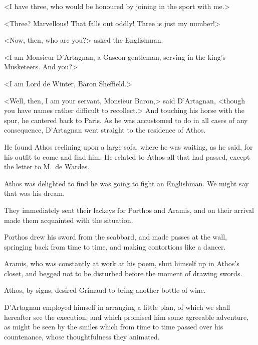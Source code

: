 <I have three, who would be honoured by joining in the sport with me.> 

<Three? Marvellous! That falls out oddly! Three is just my number!> 

<Now, then, who are you?> asked the Englishman. 

<I am Monsieur D'Artagnan, a Gascon gentleman, serving in the king's Musketeers. And you?> 

<I am Lord de Winter, Baron Sheffield.> 

<Well, then, I am your servant, Monsieur Baron,> said D'Artagnan, <though you have names rather difficult to recollect.> And touching his horse with the spur, he cantered back to Paris. As he was accustomed to do in all cases of any consequence, D'Artagnan went straight to the residence of Athos. 

He found Athos reclining upon a large sofa, where he was waiting, as he said, for his outfit to come and find him. He related to Athos all that had passed, except the letter to M.~de Wardes. 

Athos was delighted to find he was going to fight an Englishman. We might say that was his dream. 

They immediately sent their lackeys for Porthos and Aramis, and on their arrival made them acquainted with the situation. 

Porthos drew his sword from the scabbard, and made passes at the wall, springing back from time to time, and making contortions like a dancer. 

Aramis, who was constantly at work at his poem, shut himself up in Athos's closet, and begged not to be disturbed before the moment of drawing swords. 

Athos, by signs, desired Grimaud to bring another bottle of wine. 

D'Artagnan employed himself in arranging a little plan, of which we shall hereafter see the execution, and which promised him some agreeable adventure, as might be seen by the smiles which from time to time passed over his countenance, whose thoughtfulness they animated.